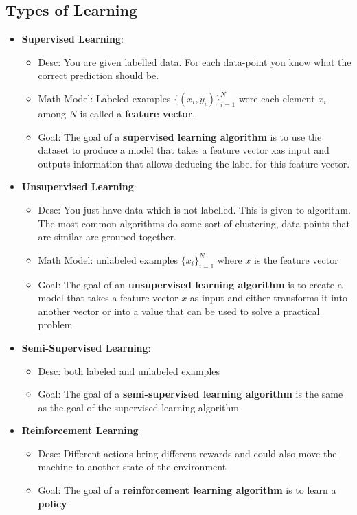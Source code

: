 \begin{multicols}{2}
\subsection{Types of Learning}
\begin{itemize}
    \item \textbf{Supervised Learning}:
    \begin{itemize}
        \item Desc: You are given labelled data. For each data-point you know what the correct prediction should be.
        \item Math Model: Labeled examples $\{(x_i,y_i)\}^N_{i=1}$ were each element $x_i$ among $N$ is called a \textbf{feature vector}. \newline
        \item Goal: The goal of a \textbf{supervised learning algorithm} is to use the dataset to produce a model
        that takes a feature vector xas input and outputs information that allows deducing the label
        for this feature vector.
    \end{itemize}
    \item \textbf{Unsupervised Learning}:
    \begin{itemize}
        \item Desc: You just have data which is not labelled. This is given to
        algorithm. The most common algorithms do some sort of
        clustering, data-points that are similar are grouped together.
        \item Math Model: unlabeled examples $\{x_i\}^N_{i=1}$ where $x$ is the feature vector
        \item Goal: The goal of an \textbf{unsupervised learning algorithm} is
        to create a model that takes a feature vector $x$ as input and either transforms it into
        another vector or into a value that can be used to solve a practical problem
    \end{itemize}
    \item \textbf{Semi-Supervised Learning}:
    \begin{itemize}
        \item Desc: both labeled and unlabeled examples
        \item Goal: The goal of a \textbf{semi-supervised learning algorithm} is the same as the goal of
        the supervised learning algorithm
    \end{itemize}
    \item \textbf{Reinforcement Learning}
    \begin{itemize}
        \item Desc: Different actions bring different rewards and could also move the machine to another state of the environment
        \item Goal: The goal of a \textbf{reinforcement learning algorithm} is to learn a \textbf{policy}
    \end{itemize}
\end{itemize}


\end{multicols}
